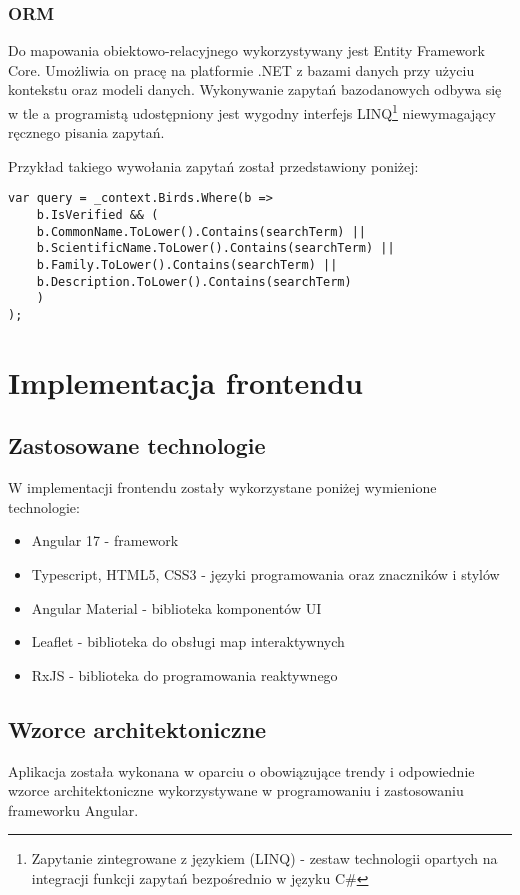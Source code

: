 \subsubsection{ORM}
Do mapowania obiektowo-relacyjnego wykorzystywany jest Entity Framework Core. Umożliwia on pracę na platformie .NET z bazami danych przy użyciu kontekstu oraz modeli danych. Wykonywanie zapytań bazodanowych odbywa się w tle a programistą udostępniony jest wygodny interfejs LINQ\footnote{Zapytanie zintegrowane z językiem (LINQ) - zestaw technologii opartych na integracji funkcji zapytań bezpośrednio w języku C\#\cite{dotnet_linq}} niewymagający ręcznego pisania zapytań.

Przykład takiego wywołania zapytań został przedstawiony poniżej:
\begin{lstlisting}[style=csharp, caption={Przykład wywołania zapytania bazodanowego za pomocą EF Core oraz LINQ}]
var query = _context.Birds.Where(b =>
	b.IsVerified && (
	b.CommonName.ToLower().Contains(searchTerm) ||
	b.ScientificName.ToLower().Contains(searchTerm) ||
	b.Family.ToLower().Contains(searchTerm) ||
	b.Description.ToLower().Contains(searchTerm)
	)
);
\end{lstlisting}

\section{Implementacja frontendu}

\subsection{Zastosowane technologie}
W implementacji frontendu zostały wykorzystane poniżej wymienione technologie:
\begin{itemize}
	\item Angular 17 - framework
	\item Typescript, HTML5, CSS3 - języki programowania oraz znaczników i stylów
	\item Angular Material - biblioteka komponentów UI
	\item Leaflet - biblioteka do obsługi map interaktywnych
	\item RxJS - biblioteka do programowania reaktywnego
\end{itemize}

\subsection{Wzorce architektoniczne}
Aplikacja została wykonana w oparciu o obowiązujące trendy i odpowiednie wzorce architektoniczne wykorzystywane w programowaniu i zastosowaniu frameworku Angular.

